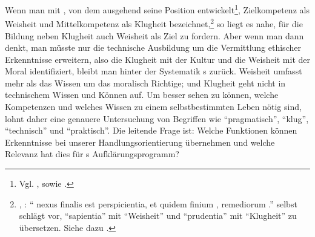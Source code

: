 Wenn man mit , von dem
ausgehend  seine Position entwickelt\footnote{Vgl.
\cite[][5, 29--65]{Schwaiger:KategorischeundandereImperative1999}, sowie
\cite[][152]{Schwaiger:KlugheitbeiKant2002}.}, Zielkompetenz als Weisheit und
Mittelkompetenz als Klugheit
bezeichnet,\footnote{\cite[Vgl.][\S~882]{Baumgarten:Metaphysica---Metaphysik2011},
\cite[XVII: 172.22--29]{Kant:GesammelteWerke1900ff.}: \enquote{
nexus finalis  est perspicientia, et quidem finium
, remediorum .} 
selbst schlägt vor, \enquote{sapientia} mit \enquote{Weisheit} und
\enquote{prudentia} mit \enquote{Klugheit} zu übersetzen. Siehe dazu
\cite[][152]{Schwaiger:KlugheitbeiKant2002}.} so liegt es nahe, für die Bildung
neben Klugheit auch Weisheit als Ziel zu fordern. Aber wenn man dann denkt, man müsste
nur die technische Ausbildung um die Vermittlung ethischer Erkenntnisse
erweitern, also die Klugheit mit der Kultur und die Weisheit mit der Moral
identifiziert, bleibt man hinter der Systematik
s zurück. Weisheit umfasst mehr als das Wissen um das moralisch
Richtige; und Klugheit geht nicht in technischem Wissen und Können auf. Um
besser sehen zu können, welche Kompetenzen und welches Wissen zu einem
selbstbestimmten Leben nötig sind, lohnt daher eine genauere Untersuchung von
Begriffen wie \enquote{pragmatisch}, \enquote{klug}, \enquote{technisch} und
\enquote{praktisch}. Die leitende Frage ist: Welche Funktionen können
Erkenntnisse bei unserer Handlungsorientierung übernehmen und welche Relevanz
hat dies für s Aufklärungsprogramm?

